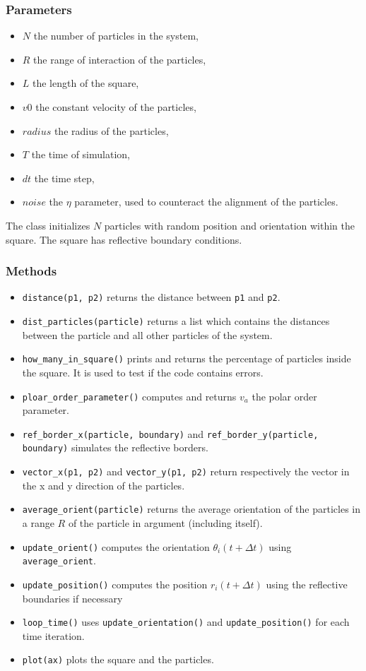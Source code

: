 \documentclass{article}
\begin{document}
\subsubsection*{Parameters}
\begin{itemize}
    \item $N$ the number of particles in the system,
    \item $R$ the range of interaction of the particles,
    \item $L$ the length of the square,
    \item $v0$ the constant velocity of the particles,
    \item $radius$ the radius of the particles,
    \item $T$ the time of simulation,
    \item $dt$ the time step,
    \item $noise$ the $\eta$ parameter, used to counteract the alignment of the particles.
\end{itemize}
The class initializes $N$ particles with random position and orientation within the square. The square has reflective boundary conditions.
\subsubsection*{Methods}
\begin{itemize}
    \item \texttt{distance(p1, p2)} returns the distance between \texttt{p1} and \texttt{p2}.
    \item \texttt{dist\_particles(particle)} returns a list which contains the distances between the particle and all other particles of the system.
    \item \texttt{how\_many\_in\_square()} prints and returns the percentage of particles inside the square. It is
    used to test if the code contains errors.
    \item \texttt{ploar\_order\_parameter()} computes and returns $v_a$ the polar order parameter.
    \item \texttt{ref\_border\_x(particle, boundary)} and \texttt{ref\_border\_y(particle, boundary)}
    simulates the reflective borders.
    \item \texttt{vector\_x(p1, p2)} and \texttt{vector\_y(p1, p2)} return respectively the vector in the x and y direction of the particles.
    \item \texttt{average\_orient(particle)} returns the average orientation of the particles in a range $R$ of the particle in argument (including itself).
    \item \texttt{update\_orient()} computes the orientation $\theta_i(t + \Delta t)$ using \texttt{average\_orient}.
    \item \texttt{update\_position()} computes the position $r_i(t + \Delta t)$ using the reflective boundaries if necessary
    \item \texttt{loop\_time()} uses \texttt{update\_orientation()} and \texttt{update\_position()} for each time iteration.
    \item \texttt{plot(ax)} plots the square and the particles.
\end{itemize}
\end{document}
